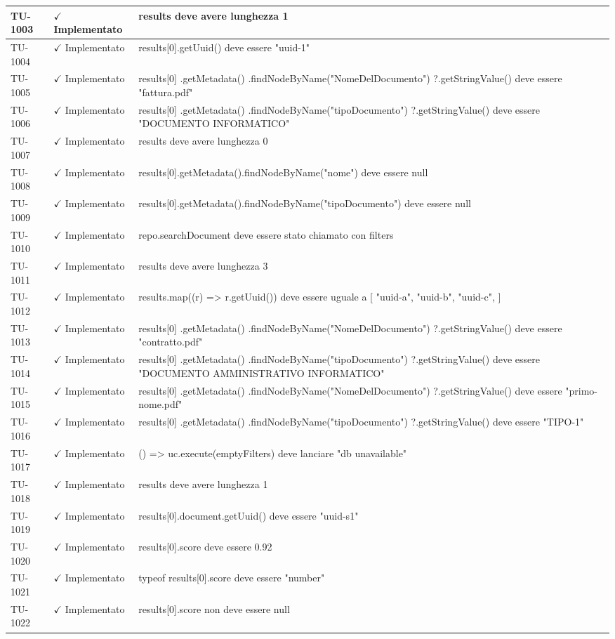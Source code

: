 ﻿\documentclass[a4paper,12pt]{article}
\newcommand{\ok}{\textcolor{green!60!black}{$\checkmark$ Implementato}}
\begin{document}
\begin{longtable}{|p{2cm}|p{3.5cm}|p{9.5cm}|}
\hline
TU-1003 & \ok & results deve avere lunghezza 1 \\
\hline
TU-1004 & \ok & results[0].getUuid() deve essere "uuid-1" \\
\hline
TU-1005 & \ok & results[0] .getMetadata() .findNodeByName("NomeDelDocumento") ?.getStringValue() deve essere "fattura.pdf" \\
\hline
TU-1006 & \ok & results[0] .getMetadata() .findNodeByName("tipoDocumento") ?.getStringValue() deve essere "DOCUMENTO INFORMATICO" \\
\hline
TU-1007 & \ok & results deve avere lunghezza 0 \\
\hline
TU-1008 & \ok & results[0].getMetadata().findNodeByName("nome") deve essere null \\
\hline
TU-1009 & \ok & results[0].getMetadata().findNodeByName("tipoDocumento") deve essere null \\
\hline
TU-1010 & \ok & repo.searchDocument deve essere stato chiamato con filters \\
\hline
TU-1011 & \ok & results deve avere lunghezza 3 \\
\hline
TU-1012 & \ok & results.map((r) => r.getUuid()) deve essere uguale a [ "uuid-a", "uuid-b", "uuid-c", ] \\
\hline
TU-1013 & \ok & results[0] .getMetadata() .findNodeByName("NomeDelDocumento") ?.getStringValue() deve essere "contratto.pdf" \\
\hline
TU-1014 & \ok & results[0] .getMetadata() .findNodeByName("tipoDocumento") ?.getStringValue() deve essere "DOCUMENTO AMMINISTRATIVO INFORMATICO" \\
\hline
TU-1015 & \ok & results[0] .getMetadata() .findNodeByName("NomeDelDocumento") ?.getStringValue() deve essere "primo-nome.pdf" \\
\hline
TU-1016 & \ok & results[0] .getMetadata() .findNodeByName("tipoDocumento") ?.getStringValue() deve essere "TIPO-1" \\
\hline
TU-1017 & \ok & () => uc.execute(emptyFilters) deve lanciare "db unavailable" \\
\hline
TU-1018 & \ok & results deve avere lunghezza 1 \\
\hline
TU-1019 & \ok & results[0].document.getUuid() deve essere "uuid-s1" \\
\hline
TU-1020 & \ok & results[0].score deve essere 0.92 \\
\hline
TU-1021 & \ok & typeof results[0].score deve essere "number" \\
\hline
TU-1022 & \ok & results[0].score non deve essere null \\

\end{longtable}
\end{document}
